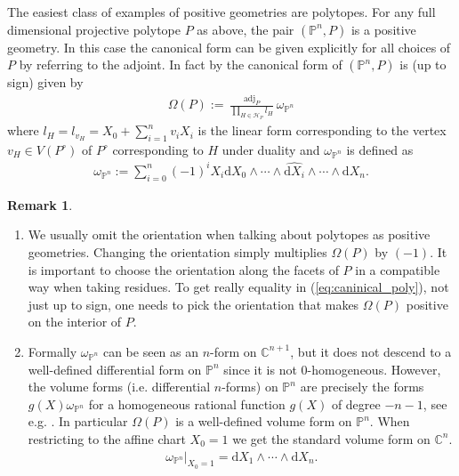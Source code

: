 \documentclass[a4paper,10pt]{amsart}
\theoremstyle{definition}
\newtheorem{remark}[defin]{Remark}
\theoremstyle{plain}
\newcommand{\adj}{\operatorname{adj}} %
\newcommand{\dd}{\text{d}}
\newcommand{\cH}{{\mathcal H}}
\newcommand{\C}{{\mathbb C}}
\newcommand{\pp}{\mathbb{P}}
\begin{document}
The easiest class of examples of positive geometries are polytopes. For any full dimensional projective polytope $P$ as above, the pair $(\pp^n,P)$ is a positive geometry. In this case the canonical form can be given explicitly for all choices of $P$ by referring to the adjoint. In fact by \cite{Gaetz2020Adjoints} the canonical form of $(\pp^n,P)$ is (up to sign) given by 
 \begin{align}
 \label{eq:caninical_poly}
    \Omega(P):=\frac{\adj_P}{\prod_{H\in \cH_P}l_H} \omega_{\pp^n}
\end{align}
where $l_H=l_{v_H}=X_0+\sum_{i=1}^nv_iX_i$ is the linear form corresponding to the vertex $v_H\in V(P^\circ)$ of $P^\circ$ corresponding to $H$ under duality and $\omega_{\pp^n}$ is defined as \begin{align*}
    \omega_{\pp^n}:=\sum_{i=0}^n(-1)^iX_i\dd X_0\wedge\cdots\wedge \widehat{\dd X_i} \wedge \cdots \wedge \dd X_n.
\end{align*}
\begin{remark}
    \begin{enumerate}
        \item We usually omit the orientation when talking about polytopes as positive geometries. Changing the orientation simply multiplies $\Omega(P)$ by $(-1)$.  It is important to choose the orientation along the facets of $P$ in a compatible way when taking residues. To get really equality in (\ref{eq:caninical_poly}), not just up to sign, one needs to pick the orientation that makes $\Omega(P)$ positive on the interior of $P$.
        \item Formally $\omega_{\pp^n}$ can be seen as an $n$-form on $\C^{n+1}$, but it does not descend to a well-defined differential form on $\pp^n$ since it is not $0$-homogeneous. However, the volume forms (i.e. differential $n$-forms) on $\pp^n$ are precisely the forms $g(X)\omega_{\pp^n}$ for a homogeneous rational function $g(X)$ of degree $-n-1$, see e.g. \cite[Appendix C]{ArkanihamedBaiLam2017PosGeom}. In particular $\Omega(P)$ is a well-defined volume form on $\pp^n$. When restricting to the affine chart $X_0=1$ we get the standard volume form on $\C^n$. \begin{align*}
            \omega_{\pp^n}|_{X_0=1}=\dd X_1\wedge \cdots \wedge \dd X_n.
        \end{align*}
    \end{enumerate}
\end{remark}
\end{document}
